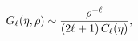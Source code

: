 $\mathop{G_{\ell}\/}\nolimits\!\left(\eta,\rho\right)\sim\dfrac{\rho^{-\ell}}{(%
2\ell+1)\mathop{C_{\ell}\/}\nolimits\!\left(\eta\right)},$